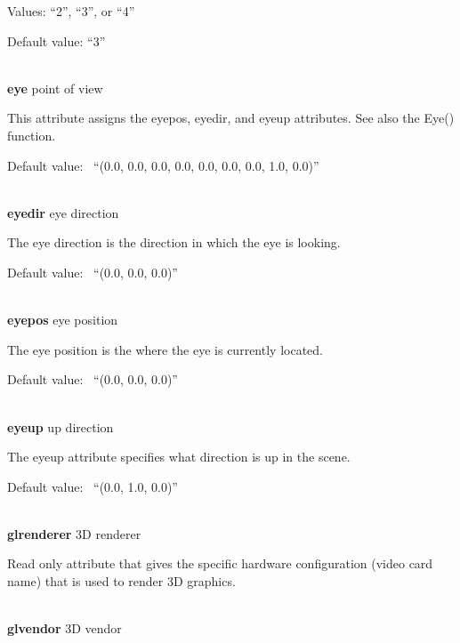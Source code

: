 \documentclass[letterpaper]{article}
\begin{document}
\bigskip

Values: \textsf{{}``2''}, \textsf{{}``3''}, or \textsf{{}``4''}

Default value: \textsf{{}``3''}

\noindent\hrulefill\\
\noindent\textsf{\textbf{eye}} \hfill point of view


\bigskip

This attribute assigns the eyepos, eyedir, and eyeup attributes.
See also the \textsf{Eye()} function.


\bigskip

Default value: \ \textsf{{}``(0.0, 0.0, 0.0, 0.0, 0.0, 0.0, 0.0, 1.0, 0.0)''}

\noindent\hrulefill\\
\noindent\textsf{\textbf{eyedir}} \hfill eye direction


\bigskip

The eye direction is the direction in which the eye is looking.


\bigskip

Default value: \ \textsf{{}``(0.0, 0.0, 0.0)''}

\noindent\hrulefill\\
\noindent\textsf{\textbf{eyepos}} \hfill eye position


\bigskip

The eye position is the where the eye is currently located.


\bigskip

Default value: \ \textsf{{}``(0.0, 0.0, 0.0)''}

\noindent\hrulefill\\
\noindent\textsf{\textbf{eyeup}} \hfill up direction


\bigskip

The eyeup attribute specifies what direction is up in the scene.


\bigskip

Default value: \ \textsf{{}``(0.0, 1.0, 0.0)''}

\noindent\hrulefill\\
\noindent\textsf{\textbf{glrenderer}} \hfill 3D renderer


\bigskip

Read only attribute that gives the specific hardware configuration
(video card name) that is used to render 3D graphics.

\noindent\hrulefill\\
\noindent\textsf{\textbf{glvendor}} \hfill 3D vendor
\end{document}
